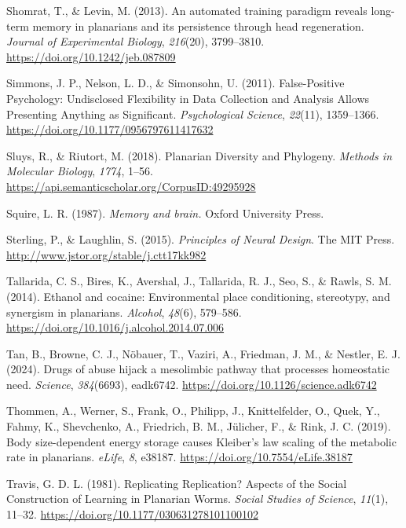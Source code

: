 \documentclass[
  jou,
  floatsintext,
  longtable,
  nolmodern,
  notxfonts,
  notimes,
  donotrepeattitle,
  colorlinks=true,linkcolor=blue,citecolor=blue,urlcolor=blue]{apa7}
\newlength{\cslhangindent}
\newenvironment{CSLReferences}[2] %
 {\begin{list}{}{%
  \setlength{\itemindent}{0pt}
  \setlength{\leftmargin}{0pt}
  \setlength{\parsep}{0pt}
  \ifodd #1
   \setlength{\leftmargin}{\cslhangindent}
   \setlength{\itemindent}{-1\cslhangindent}
  \fi
  \setlength{\itemsep}{#2\baselineskip}}}
 {\end{list}}
\begin{document}
\begin{CSLReferences}{1}{0}
Shomrat, T., \& Levin, M. (2013). An automated training paradigm reveals
long-term memory in planarians and its persistence through head
regeneration. \emph{Journal of Experimental Biology}, \emph{216}(20),
3799--3810. \url{https://doi.org/10.1242/jeb.087809}

Simmons, J. P., Nelson, L. D., \& Simonsohn, U. (2011). False-{Positive}
{Psychology}: {Undisclosed} {Flexibility} in {Data} {Collection} and
{Analysis} {Allows} {Presenting} {Anything} as {Significant}.
\emph{Psychological Science}, \emph{22}(11), 1359--1366.
\url{https://doi.org/10.1177/0956797611417632}

Sluys, R., \& Riutort, M. (2018). Planarian {Diversity} and {Phylogeny}.
\emph{Methods in Molecular Biology}, \emph{1774}, 1--56.
\url{https://api.semanticscholar.org/CorpusID:49295928}

Squire, L. R. (1987). \emph{Memory and brain.} Oxford University Press.

Sterling, P., \& Laughlin, S. (2015). \emph{Principles of {Neural}
{Design}}. The MIT Press. \url{http://www.jstor.org/stable/j.ctt17kk982}

Tallarida, C. S., Bires, K., Avershal, J., Tallarida, R. J., Seo, S., \&
Rawls, S. M. (2014). Ethanol and cocaine: {Environmental} place
conditioning, stereotypy, and synergism in planarians. \emph{Alcohol},
\emph{48}(6), 579--586.
\url{https://doi.org/10.1016/j.alcohol.2014.07.006}

Tan, B., Browne, C. J., Nöbauer, T., Vaziri, A., Friedman, J. M., \&
Nestler, E. J. (2024). Drugs of abuse hijack a mesolimbic pathway that
processes homeostatic need. \emph{Science}, \emph{384}(6693), eadk6742.
\url{https://doi.org/10.1126/science.adk6742}

Thommen, A., Werner, S., Frank, O., Philipp, J., Knittelfelder, O.,
Quek, Y., Fahmy, K., Shevchenko, A., Friedrich, B. M., Jülicher, F., \&
Rink, J. C. (2019). Body size-dependent energy storage causes
{Kleiber}'s law scaling of the metabolic rate in planarians.
\emph{eLife}, \emph{8}, e38187.
\url{https://doi.org/10.7554/eLife.38187}

Travis, G. D. L. (1981). Replicating {Replication}? {Aspects} of the
{Social} {Construction} of {Learning} in {Planarian} {Worms}.
\emph{Social Studies of Science}, \emph{11}(1), 11--32.
\url{https://doi.org/10.1177/030631278101100102}


\end{CSLReferences}
\end{document}
